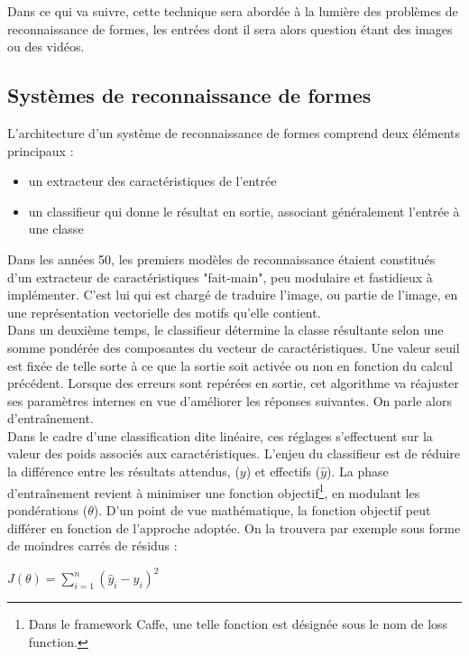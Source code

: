 \documentclass[a4paper,10pt]{report}
\begin{document}
Dans ce qui va suivre, cette technique sera abordée à la lumière des problèmes de reconnaissance de formes, les entrées dont il sera alors question étant des images ou des vidéos.

\subsection{Systèmes de reconnaissance de formes}

L'architecture d'un système de reconnaissance de formes comprend deux éléments principaux :

\begin{itemize}
  \item un extracteur des caractéristiques de l'entrée
  \item un classifieur qui donne le résultat en sortie, associant généralement l'entrée à une classe
\end{itemize}


Dans les années 50, les premiers modèles de reconnaissance étaient constitués d'un extracteur de caractéristiques "fait-main", peu modulaire et fastidieux à implémenter\cite{Bib_LeCun}.
C'est lui qui est chargé de traduire l'image, ou partie de l'image, en une représentation vectorielle des motifs qu'elle contient. 
\\

Dans un deuxième temps, le classifieur détermine la classe résultante selon une somme pondérée des composantes du vecteur de caractéristiques. 
Une valeur seuil est fixée de telle sorte à ce que la sortie soit activée ou non en fonction du calcul précédent. 
Lorsque des erreurs sont repérées en sortie, cet algorithme va réajuster ses paramètres internes en vue d'améliorer les réponses suivantes. On parle alors d'entraînement.
\\

Dans le cadre d'une classification dite linéaire, ces réglages s'effectuent sur la valeur des poids associés aux caractéristiques.
L'enjeu du classifieur est de réduire la différence entre les résultats attendus, ($y$) et effectifs ($\hat{y}$).
La phase d'entraînement revient à minimiser une fonction objectif\footnote{Dans le framework Caffe, une telle fonction est désignée sous le nom de loss function.}, en modulant les pondérations ($\theta$).
D'un point de vue mathématique, la fonction objectif peut différer en fonction de l'approche adoptée. On la trouvera par exemple sous forme de moindres carrés de résidus\cite{Bib_WikiLS} :  

\begin{center} $ J({\theta}) =  \sum\limits_{i=1}^{n} (\hat{y}_{i} - y_{i})^2 $ \end{center} 
\end{document}
